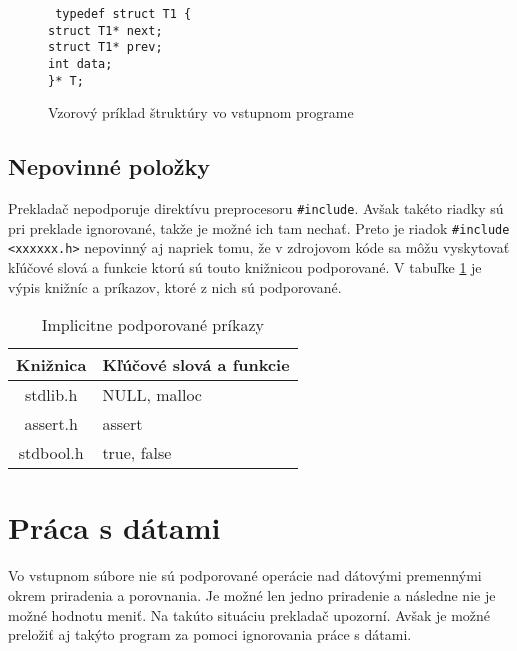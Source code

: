 \begin{center}
\begin{figure}
\texttt{
typedef struct T1 \{\\                                                            
\tab struct T1* next;\\                                                            
\tab struct T1* prev;\\                                                          
\tab int data;\\                                                                   
\}* T;
}

\label{fig:struct}
\caption{Vzorový príklad štruktúry vo vstupnom programe}
\end{figure}
\end{center}

\subsection{Nepovinné položky}
Prekladač nepodporuje direktívu preprocesoru \texttt{\#include}. Avšak takéto riadky sú pri preklade ignorované, takže je možné ich tam nechať. Preto je riadok \texttt{\#include <xxxxxx.h>} nepovinný aj napriek tomu, že v zdrojovom kóde sa môžu vyskytovať kľúčové slová a funkcie ktorú sú touto knižnicou podporované. V tabuľke \ref{table:kniz} je výpis knižníc a príkazov, ktoré z nich sú podporované.

\begin{table}[]
\centering
\caption{Implicitne podporované príkazy}
\label{table:kniz}
\begin{tabular}{|c|l|}
\hline
\textbf{Knižnica} & \textbf{Kľúčové slová a  funkcie} \\ \hline
stdlib.h          & NULL, malloc                      \\ \hline
assert.h          & assert                            \\ \hline
stdbool.h         & true, false                       \\ \hline
\end{tabular}
\end{table}


\section{Práca s dátami}
\label{sec_data}
Vo vstupnom súbore nie sú podporované operácie nad dátovými premennými okrem priradenia a porovnania. Je možné len jedno priradenie a následne nie je možné hodnotu meniť. Na takúto situáciu prekladač upozorní. Avšak je možné preložiť aj takýto program za pomoci ignorovania práce s dátami.


